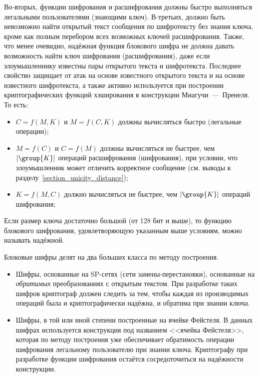 Во-вторых, функции шифрования и расшифрования должны быстро выполняться легальными пользователями (знающими ключ). В-третьих,  должно быть невозможно найти открытый текст сообщения по шифротексту без знания ключа, кроме как полным перебором всех возможных ключей расшифрования. Также, что менее очевидно, надёжная функция блокового шифра не должна давать возможность найти ключ шифрования (расшифрования), даже если злоумышленнику известны пары открытого текста и шифротекста. Последнее свойство защищает от атак на основе известного открытого текста и на основе известного шифротекста, а также активно используется при построении криптографических функций хэширования в конструкции Миагучи~---~Пренеля. То есть:
\begin{itemize}
	\item $C = f \left( M, K \right)$ и $M = f \left( C, K \right)$ должны вычисляться быстро (легальные операции);
	\item $M = f \left( C \right)$ и $C = f \left( M \right)$ должны вычисляться не быстрее, чем $\left| \group{K} \right|$ операций расшифрования (шифрования), при условии, что злоумышленник может отличить корректное сообщение (см. выводы к разделу~\ref{section_unicity_distance});
	\item $K = f \left( M, C \right)$ должно вычисляться не быстрее, чем $\left| \group{K} \right|$ операций шифрования;
\end{itemize}

Если размер ключа достаточно большой (от 128 бит и выше), то функцию блокового шифрования, удовлетворяющую указанным выше условиям, можно называть надёжной.

Блоковые шифры делят на два больших класса по методу построения.
\begin{itemize}
	\item Шифры, основанные на SP-сетях (сети замены-перестановки), основанные на \textit{обратимых} преобразованиях с открытым текстом. При разработке таких шифров криптограф должен следить за тем, чтобы каждая из производимых операций была и криптографически надёжна, и обратима при знании ключа.
	\item Шифры, в той или иной степени построенные на ячейке Фейстеля. В данных шифрах используется конструкция под названием <<ячейка Фейстеля>>, которая по методу построения уже обеспечивает обратимость операции шифрования легальному пользователю при знании ключа. Криптографу при разработке функции шифрования остаётся сосредоточиться на надёжности конструкции.
\end{itemize}


